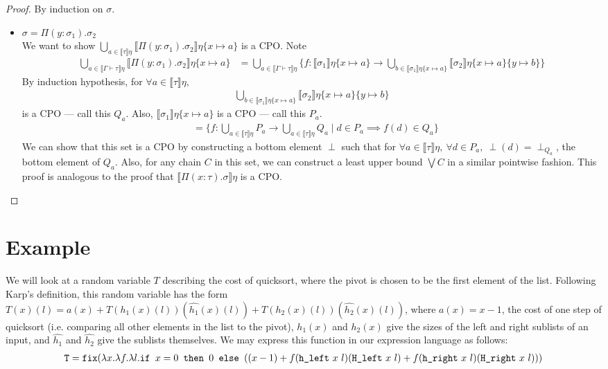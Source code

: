 \begin{proof}
By induction on $\sigma$.
\begin{itemize}
\item $\sigma = \Pi(y: \sigma_1).\sigma_2$ \\
We want to show $\bigcup_{a \in \llbracket \tau \rrbracket\eta} 
\llbracket \Pi(y: \sigma_1).\sigma_2\rrbracket\eta\{x \mapsto a\}$ is a CPO. Note
\begin{align*}
\bigcup_{a \in \llbracket \Gamma \vdash \tau \rrbracket\eta} 
\llbracket \Pi(y: \sigma_1).\sigma_2\rrbracket\eta\{x \mapsto a\}
&= \bigcup_{a \in \llbracket \Gamma \vdash \tau \rrbracket\eta} \{ f : \llbracket \sigma_1 \rrbracket\eta\{x\mapsto a\}
\rightarrow \bigcup_{b \in \llbracket \sigma_1 \rrbracket\eta\{x\mapsto a\}} \llbracket \sigma_2\rrbracket\eta
\{x\mapsto a\}\{y\mapsto b\}\}
\end{align*} 
By induction hypothesis, for $\forall a \in \llbracket \tau \rrbracket\eta,$
\begin{align*}
\bigcup_{b \in \llbracket \sigma_1 \rrbracket\eta\{x\mapsto a\}} \llbracket \sigma_2\rrbracket\eta
\{x\mapsto a\}\{y\mapsto b\}
\end{align*} 
is a CPO --- call this $Q_a$.  Also,  $\llbracket\sigma_1\rrbracket\eta\{x\mapsto a\} $ is a CPO --- call this $P_a$.
\begin{align*}
&= \{ f : \bigcup_{a \in \llbracket\tau\rrbracket\eta} P_a \rightarrow 
\bigcup_{a \in \llbracket \tau \rrbracket\eta} Q_a \mid
d \in P_a \implies f(d) \in Q_a\}
\end{align*}
We can show that this set is a CPO by constructing a bottom element $\perp$ such that for 
$\forall a \in \llbracket\tau\rrbracket\eta, \ \forall d \in P_a, \
\perp(d) = \perp_{Q_a}$, the bottom element of $Q_a$. Also, for any chain $C$ in this set, we can construct
a least upper bound $\bigvee C$ in a similar pointwise fashion. This proof is analogous to the proof that
$\llbracket \Pi(x: \tau).\sigma\rrbracket\eta$ is a CPO.
\end{itemize}
\end{proof}

\section{Example}
We will look at a random variable $T$ describing the cost of quicksort, where the pivot is chosen to be the first element 
of the list. Following Karp's definition, this random variable has the form $T(x)(l) = a(x) + T(h_1(x)(l))(\hat{h_1}(x)(l))
+ T(h_2(x)(l))(\hat{h_2}(x)(l))$, where $a(x) = x-1$, the cost of one step of quicksort (i.e. comparing all other elements
in the list to the pivot), $h_1(x)$ and $h_2(x)$ give the sizes of the left and right sublists of an input, and
$\hat{h_1}$ and $\hat{h_2}$ give the sublists themselves. We may express this function in our expression language
as follows:
\begin{align*}
\texttt{T} = \texttt{fix}(\lambda x. \lambda f. \lambda l. \texttt{if } x=0 \texttt{ then } 0 \texttt{ else } ((x-1) 
		+ f(\texttt{h\_left} \ x \ l)(\texttt{H\_left} \ x \ l) + f(\texttt{h\_right} \ x \ l)(\texttt{H\_right} \ x \ l)))
\end{align*}
 
